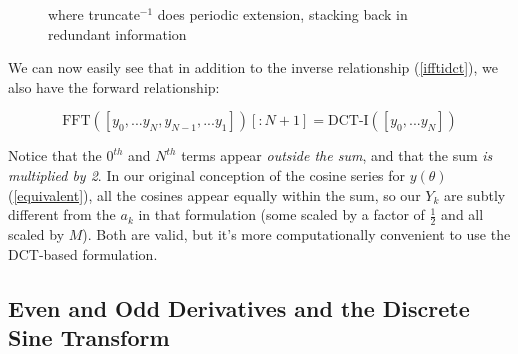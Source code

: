 \documentclass[10pt]{article}
\begin{document}
\begin{figure}[h!]
\begin{center}
\begin{minipage}{0.5\textwidth}
\centering
{}
\end{minipage}
\begin{minipage}{0.3\textwidth}\raggedright where truncate$^{-1}$ does periodic extension, stacking back in redundant information\end{minipage}
\end{center}
\end{figure}\vspace{-2mm}

We can now easily see that in addition to the inverse relationship (\autoref{ifftidct}), we also have the forward relationship:\vspace{-2mm}

$$\text{FFT}([y_0, ... y_N, y_{N-1}, ... y_1])[:\!N+1] = \text{DCT-I}([y_0, ... y_N])$$

Notice that the $0^{th}$ and $N^{th}$ terms appear \textit{outside the sum}, and that the sum \textit{is multiplied by 2}. In our original conception of the cosine series for $y(\theta)$ (\autoref{equivalent}), all the cosines appear equally within the sum, so our $Y_k$ are subtly different from the $a_k$ in that formulation (some scaled by a factor of $\frac{1}{2}$ and all scaled by $M$). Both are valid, but it's more computationally convenient to use the DCT-based formulation.

\subsection{Even and Odd Derivatives and the Discrete Sine Transform}\label{evenodd}
\end{document}

